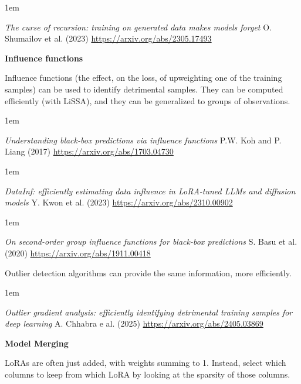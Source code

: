 \documentclass[a5paper]{article}
\newenvironment{reference}{%
  \medskip\goodbreak
  \parskip 0pt
  \raggedright
  \leftskip 1em
  \obeylines
}{\par\medskip\goodbreak}
\def\subsection#1{{\par\bigskip\goodbreak\large\bfseries #1\par}}
\begin{document}
\begin{reference}
  \emph{The curse of recursion: training on  generated data makes models forget}
  O. Shumailov et al. (2023)
  \url{https://arxiv.org/abs/2305.17493}
\end{reference}

\subsection{Influence functions}

Influence functions (the effect, on the loss,
of upweighting one of the training samples)
can be used to identify detrimental samples.
They can be computed efficiently (with LiSSA),
and they can be generalized to groups of observations.

\begin{reference}
  \emph{Understanding black-box predictions  via influence functions}
  P.W. Koh and P. Liang (2017)
  \url{https://arxiv.org/abs/1703.04730}
\end{reference}

\begin{reference}
  \emph{DataInf: efficiently estimating data influence in LoRA-tuned LLMs and diffusion models}
  Y. Kwon et al. (2023)
  \url{https://arxiv.org/abs/2310.00902}
\end{reference}

\begin{reference}
  \emph{On second-order group influence functions  for black-box predictions}
  S. Basu et al. (2020)
  \url{https://arxiv.org/abs/1911.00418}
\end{reference}

Outlier detection algorithms can provide the same information,
more efficiently.

\begin{reference}
  \emph{Outlier gradient analysis:  efficiently identifying detrimental  training samples for deep learning}
  A. Chhabra e al. (2025)
  \url{https://arxiv.org/abs/2405.03869}
\end{reference}

\subsection{Model Merging}

LoRAs are often just added, with weights summing to 1.
Instead, select which columns to keep from which LoRA by looking at the sparsity of those columns.
\end{document}
